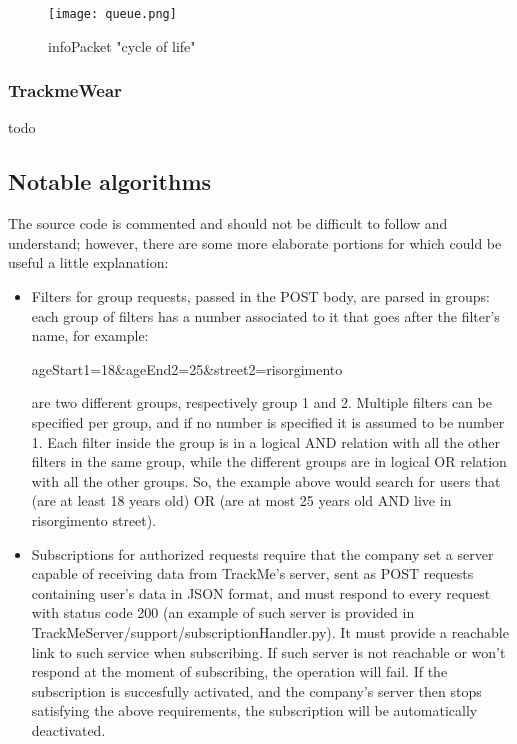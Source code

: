 \documentclass[../main.tex]{subfiles}
\begin{document}
\begin{figure}[H]
	\centering
	\texttt{[image: queue.png]}
	\caption{infoPacket "cycle of life"}
	\label{fig:infopacketscycle.png}
\end{figure}

\subsubsection{TrackmeWear}

todo

\subsection{Notable algorithms}

The source code is commented and should not be difficult to follow and understand; however, there are some more elaborate portions for which could be useful a little explanation:

\begin{itemize}

	\item Filters for group requests, passed in the POST body, are parsed in groups: each group of filters has a number associated to it that goes after the filter's name, for example:

	 ageStart1=18\&ageEnd2=25\&street2=risorgimento

	 are two different groups, respectively group 1 and 2. Multiple filters can be specified per group, and if no number is specified it is assumed to be number 1. Each filter inside the group is in a logical AND relation with all the other filters in the same group, while the different groups are in logical OR relation with all the other groups. So, the example above would search for users that (are at least 18 years old) OR (are at most 25 years old AND live in risorgimento street).
	\item Subscriptions for authorized requests require that the company set a server capable of receiving data from TrackMe's server, sent as POST requests containing user's data in JSON format, and must respond to every request with status code 200 (an example of such server is provided in TrackMeServer/support/subscriptionHandler.py). It must provide a reachable link to such service when subscribing. If such server is not reachable or won't respond at the moment of subscribing, the operation will fail. If the subscription is succesfully activated, and the company's server then stops satisfying the above requirements, the subscription will be automatically deactivated.
	
\end{itemize}
\end{document}
